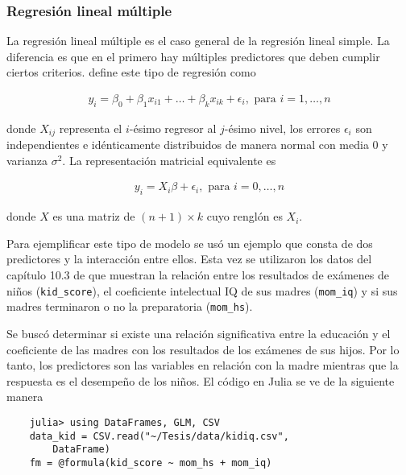 \subsubsection{Regresión lineal múltiple}
La regresión lineal múltiple es el caso general de la regresión lineal simple. La diferencia es que en el primero hay múltiples predictores que deben cumplir ciertos criterios. \cite{regression_other_stories} define este tipo de regresión como 

\begin{equation*}
    \begin{aligned}
    y_i = \beta_0 + \beta_1 x_{i1} + \dots + \beta_k x_{ik} + \epsilon_i, \text{ para } i = 1, \dots, n
    \end{aligned}
\end{equation*}

\noindent donde $X_{ij}$ representa el $i$-ésimo regresor al $j$-ésimo nivel, los errores $\epsilon_i$ son independientes e idénticamente distribuidos de manera normal con media 0 y varianza $\sigma^2$. La representación matricial equivalente es 

\begin{equation} \label{eq_rlm}
    \begin{aligned}
        y_i = X_i \beta + \epsilon_i, \text{ para } i = 0, \dots, n
    \end{aligned}
\end{equation}

\noindent donde $X$ es una matriz de $(n+1) \times k$ cuyo renglón es $X_i$.

Para ejemplificar este tipo de modelo se usó un ejemplo que consta de dos predictores y la interacción entre ellos. Esta vez se utilizaron los datos del capítulo 10.3 de \cite{regression_other_stories} que muestran la relación entre los resultados de exámenes de niños (\texttt{kid\_score}), el coeficiente intelectual IQ de sus madres (\texttt{mom\_iq}) y si sus madres terminaron o no la preparatoria (\texttt{mom\_hs}). 

Se buscó determinar si existe una relación significativa entre la educación y el coeficiente de las madres con los resultados de los exámenes de sus hijos. Por lo tanto, los predictores son las variables en relación con la madre mientras que la respuesta es el desempeño de los niños. El código en \textsf{Julia} se ve de la siguiente manera

\begin{verbatim}
    julia> using DataFrames, GLM, CSV
    data_kid = CSV.read("~/Tesis/data/kidiq.csv", 
    	DataFrame)
    fm = @formula(kid_score ~ mom_hs + mom_iq)
\end{verbatim}

